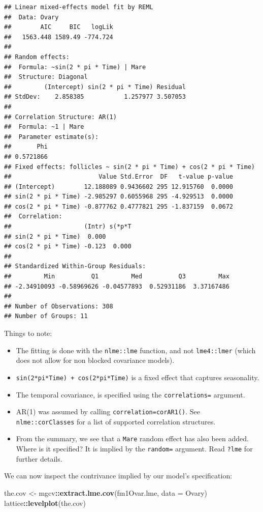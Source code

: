 \documentclass[]{book}
\newenvironment{Shaded}{\begin{snugshade}}{\end{snugshade}}
\newcommand{\KeywordTok}[1]{\textcolor[rgb]{0.13,0.29,0.53}{\textbf{#1}}}
\newcommand{\DataTypeTok}[1]{\textcolor[rgb]{0.13,0.29,0.53}{#1}}
\newcommand{\StringTok}[1]{\textcolor[rgb]{0.31,0.60,0.02}{#1}}
\newcommand{\OperatorTok}[1]{\textcolor[rgb]{0.81,0.36,0.00}{\textbf{#1}}}
\newcommand{\NormalTok}[1]{#1}
\providecommand{\tightlist}{%
  \setlength{\itemsep}{0pt}\setlength{\parskip}{0pt}}
\theoremstyle{definition}
\theoremstyle{definition}
\theoremstyle{definition}
\theoremstyle{remark}
\begin{document}
\begin{verbatim}
## Linear mixed-effects model fit by REML
##  Data: Ovary 
##        AIC     BIC   logLik
##   1563.448 1589.49 -774.724
## 
## Random effects:
##  Formula: ~sin(2 * pi * Time) | Mare
##  Structure: Diagonal
##         (Intercept) sin(2 * pi * Time) Residual
## StdDev:    2.858385           1.257977 3.507053
## 
## Correlation Structure: AR(1)
##  Formula: ~1 | Mare 
##  Parameter estimate(s):
##       Phi 
## 0.5721866 
## Fixed effects: follicles ~ sin(2 * pi * Time) + cos(2 * pi * Time) 
##                        Value Std.Error  DF   t-value p-value
## (Intercept)        12.188089 0.9436602 295 12.915760  0.0000
## sin(2 * pi * Time) -2.985297 0.6055968 295 -4.929513  0.0000
## cos(2 * pi * Time) -0.877762 0.4777821 295 -1.837159  0.0672
##  Correlation: 
##                    (Intr) s(*p*T
## sin(2 * pi * Time)  0.000       
## cos(2 * pi * Time) -0.123  0.000
## 
## Standardized Within-Group Residuals:
##         Min          Q1         Med          Q3         Max 
## -2.34910093 -0.58969626 -0.04577893  0.52931186  3.37167486 
## 
## Number of Observations: 308
## Number of Groups: 11
\end{verbatim}

Things to note:

\begin{itemize}
\tightlist
\item
  The fitting is done with the \texttt{nlme::lme} function, and not
  \texttt{lme4::lmer} (which does not allow for non blocked covariance
  models).
\item
  \texttt{sin(2*pi*Time)\ +\ cos(2*pi*Time)} is a fixed effect that
  captures seasonality.
\item
  The temporal covariance, is specified using the \texttt{correlations=}
  argument.
\item
  AR(1) was assumed by calling \texttt{correlation=corAR1()}. See
  \texttt{nlme::corClasses} for a list of supported correlation
  structures.
\item
  From the summary, we see that a \texttt{Mare} random effect has also
  been added. Where is it specified? It is implied by the
  \texttt{random=} argument. Read \texttt{?lme} for further details.
\end{itemize}

We can now inspect the contrivance implied by our model's specification:

\begin{Shaded}
\begin{Highlighting}[]
\NormalTok{the.cov <-}\StringTok{ }\NormalTok{mgcv}\OperatorTok{::}\KeywordTok{extract.lme.cov}\NormalTok{(fm1Ovar.lme, }\DataTypeTok{data =}\NormalTok{ Ovary) }
\NormalTok{lattice}\OperatorTok{::}\KeywordTok{levelplot}\NormalTok{(the.cov)}
\end{Highlighting}
\end{Shaded}
\end{document}
